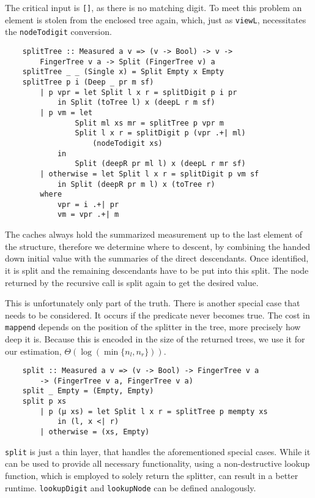 The critical input is \texttt{[]}, as there is no matching digit. To meet this problem
    an element is stolen from the enclosed tree again, which, just as \texttt{viewL}, necessitates the \texttt{nodeTodigit} conversion.

\begin{verbatim}
    splitTree :: Measured a v => (v -> Bool) -> v ->
        FingerTree v a -> Split (FingerTree v) a
    splitTree _ _ (Single x) = Split Empty x Empty
    splitTree p i (Deep _ pr m sf)
        | p vpr = let Split l x r = splitDigit p i pr 
            in Split (toTree l) x (deepL r m sf)
        | p vm = let
                Split ml xs mr = splitTree p vpr m
                Split l x r = splitDigit p (vpr .+| ml)
                    (nodeTodigit xs)
            in
                Split (deepR pr ml l) x (deepL r mr sf)
        | otherwise = let Split l x r = splitDigit p vm sf
            in Split (deepR pr m l) x (toTree r)
        where
            vpr = i .+| pr
            vm = vpr .+| m
\end{verbatim}

The caches always hold the summarized measurement up to the last element of the structure, therefore we determine where to descent, by combining the handed down initial value with the summaries of the direct descendants. Once identified, it is split and the remaining descendants have to be put into this split. The node returned by the recursive call is split again to get the desired value.\par
This is unfortunately only part of the truth. There is another special case that needs to be considered. It occurs if the predicate never becomes true.
The cost in \texttt{mappend} depends on the position of the splitter in the tree,  more precisely how deep it is. Because this is encoded in the size of the returned trees, we use it for our estimation, \(\Theta(\log(\min\{n_l,n_r\}))\).

\begin{verbatim}
    split :: Measured a v => (v -> Bool) -> FingerTree v a
        -> (FingerTree v a, FingerTree v a)
    split _ Empty = (Empty, Empty)
    split p xs
        | p (μ xs) = let Split l x r = splitTree p mempty xs
            in (l, x <| r)
        | otherwise = (xs, Empty)
\end{verbatim}

\texttt{split} is just a thin layer, that handles the aforementioned special cases. While it can be used to provide all necessary functionality, using a non-destructive lookup function, which is employed to solely return the splitter, can result in a better runtime. \texttt{lookupDigit} and \texttt{lookupNode} can be defined analogously.

